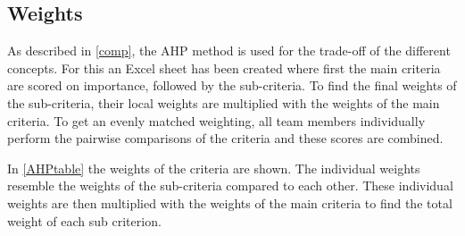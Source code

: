     

    

    
    


\subsection{Weights}
\label{subsec:weights}

As described in \autoref{comp}, the AHP method is used for the trade-off of the different concepts. For this an Excel sheet has been created where first the main criteria are scored on importance, followed by the sub-criteria. To find the final weights of the sub-criteria, their local weights are multiplied with the weights of the main criteria. To get an evenly matched weighting, all team members individually perform the pairwise comparisons of the criteria and these scores are combined. 



In \autoref{AHPtable} the weights of the criteria are shown. The individual weights resemble the weights of the sub-criteria compared to each other. These individual weights are then multiplied with the weights of the main criteria to find the total weight of each sub criterion.

